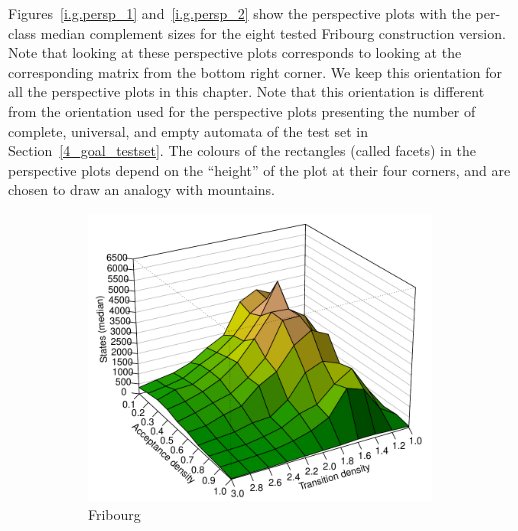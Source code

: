 Figures~\ref{i.g.persp_1} and~\ref{i.g.persp_2} show the perspective plots with the per-class median complement sizes for the eight tested Fribourg construction version. Note that looking at these perspective plots corresponds to looking at the corresponding matrix from the bottom right corner. We keep this orientation for all the perspective plots in this chapter. Note that this orientation is different from the orientation used for the perspective plots presenting the number of complete, universal, and empty automata of the \goal{} test set in Section~\ref{4_goal_testset}. The colours of the rectangles (called facets) in the perspective plots depend on the ``height'' of the plot at their four corners, and are chosen to draw an analogy with mountains.

\def\perspwidth{0.475}
\begin{figure}[ht]
\centering
  \hfill
  \begin{subfigure}[t]{\perspwidth\textwidth}
  \centering
  \includegraphics[width=\textwidth]{../results/figures/internal/goal/s.median.Fribourg.pdf}
  \caption{Fribourg}
  \end{subfigure}
  \hfill
  \begin{subfigure}[t]{\perspwidth\textwidth}
  \centering

\end{subfigure}
\end{figure}
